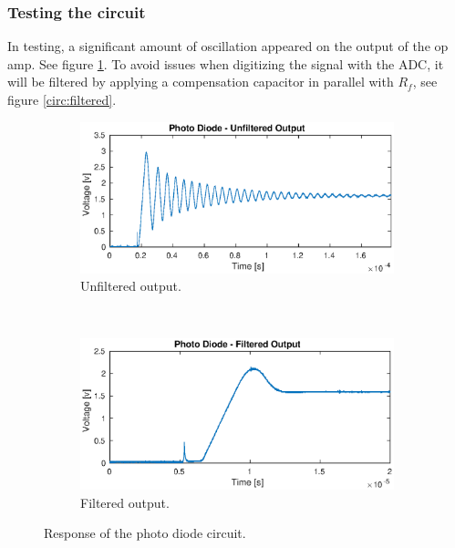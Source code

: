 \subsubsection{Testing the circuit}
In testing, a significant amount of oscillation appeared on the output of the op amp. See figure \ref{fig:oscillation}. To avoid issues when digitizing the signal with the ADC, it will be filtered by applying a compensation capacitor in parallel with $R_f$, see figure \ref{circ:filtered}.

\begin{figure}
	\centering
	\begin{subfigure}{\linewidth}
		\includegraphics[width=\linewidth]{images/unfiltered}
		\caption{Unfiltered output.}
		\label{fig:oscillation}
	\end{subfigure}\\
	\begin{subfigure}{\linewidth}
		\includegraphics[width=\linewidth]{images/filtered}
		\caption{Filtered output.}
		\label{fig:nooscillation}
	\end{subfigure}
	\caption{Response of the photo diode circuit.}
	\label{fig:photoresponse}
\end{figure}

